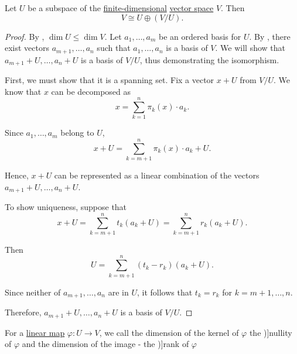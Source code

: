 \begin{proposition}\label{thm:rank_nullity_via_subspaces}
  Let \( U \) be a subspace of the \hyperref[thm:vector_space_dimension]{finite-dimensional} \hyperref[def:vector_space]{vector space} \( V \). Then
  \begin{equation*}
    V \cong U \oplus (V / U).
  \end{equation*}
\end{proposition}
\begin{proof}
  By , \( \dim U \leq \dim V \). Let \( a_1, \ldots, a_m \) be an ordered basis for \( U \). By , there exist vectors \( a_{m+1}, \ldots, a_n \) such that \( a_1, \ldots, a_n \) is a basis of \( V \). We will show that \( a_{m+1} + U, \ldots, a_n + U \) is a basis of \( V / U \), thus demonstrating the isomorphism.

  First, we must show that it is a spanning set. Fix a vector \( x + U \) from \( V / U \). We know that \( x \) can be decomposed as
  \begin{equation*}
    x = \sum_{k=1}^n \pi_k(x) \cdot a_k.
  \end{equation*}

  Since \( a_1, \ldots, a_m \) belong to \( U \),
  \begin{equation*}
    x + U = \sum_{k={m+1}}^n \pi_k(x) \cdot a_k + U.
  \end{equation*}

  Hence, \( x + U \) can be represented as a linear combination of the vectors \( a_{m+1} + U, \ldots, a_n + U \).

  To show uniqueness, suppose that
  \begin{equation*}
    x + U = \sum_{k={m+1}}^n t_k (a_k + U) = \sum_{k={m+1}}^n r_k (a_k + U).
  \end{equation*}

  Then
  \begin{equation*}
    U = \sum_{k={m+1}}^n (t_k - r_k) (a_k + U).
  \end{equation*}

  Since neither of \( a_{m+1}, \ldots, a_n \) are in \( U \), it follows that \( t_k = r_k \) for \( k = m + 1, \ldots, n \).

  Therefore, \( a_{m+1} + U, \ldots, a_n + U \) is a basis of \( V / U \).
\end{proof}

\begin{definition}\label{def:rank_and_nullity}
  For a \hyperref[def:linear_function]{linear map} \( \varphi: U \to V \), we call the dimension of the kernel of \( \varphi \) the \term[ru=дефект (\cite[250]{Тыртышников2007ЛинейнаяАлгебра})]{nullity} of \( \varphi \) and the dimension of the image - the \term[ru=ранг (\cite[250]{Тыртышников2007ЛинейнаяАлгебра})]{rank} of \( \varphi \)
\end{definition}

